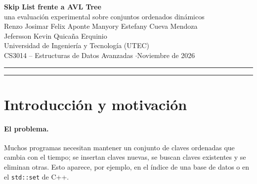 \documentclass[11pt,a4paper]{article}
\begin{document}
\thispagestyle{empty}
\begin{center}
  {\LARGE\bfseries Skip List frente a AVL Tree}\\[5pt]
  {\large una evaluación experimental sobre conjuntos ordenados dinámicos}\\[14pt]
  {\normalsize Renzo Josimar Felix Aponte \qquad Manyory Estefany Cueva Mendoza}\\[2pt]
  {\normalsize Jefersson Kevin Quicaña Erquinio}\\[6pt]
  {\small Universidad de Ingeniería y Tecnología (UTEC)}\\
  {\small CS3014 -- Estructuras de Datos Avanzadas \quad$\cdot$\quad Noviembre de 2026}
\end{center}
\vspace{2pt}
\noindent\rule{\textwidth}{0.4pt}

\begin{abstract}
\noindent
Implementamos desde cero, en C++17 y con una arquitectura hexagonal, una Skip
List y un AVL Tree, y comparamos experimentalmente su tiempo de búsqueda,
inserción y eliminación con tamaños de entrada entre $10^3$ y $10^6$ y datos en
orden aleatorio, ordenado e inverso. Ambas estructuras tienen costo
$O(\log n)$ (esperado en la skip list, de peor caso en el AVL). Con $p = 1/2$,
el AVL fue más rápido en las tres operaciones y en todos los escenarios; con
$n = 10^6$ y datos aleatorios, la búsqueda fue unas $2.6$ veces más rápida y la
inserción y la eliminación unas $2$ veces. El orden de los datos afectó mucho
más que la estructura elegida; insertar claves ordenadas fue hasta $8$ veces
más rápido que insertarlas al azar en ambas estructuras, lo que atribuimos a la
localidad de caché. Al variar $p \in \{0.25, 0.50, 0.80\}$ en la Skip List,
vimos que $p = 0.50$ dio el menor tiempo en consultas aleatorias, $p = 0.25$
redujo niveles y memoria a costa de más fallos de caché ($1.2$--$1.5\times$ más
lenta a $n = 10^6$), y $p = 0.80$ degeneró hasta ser $51\times$ más lenta que el
AVL en $n = 10^5$ al saturar \texttt{MaxLevel}$\,=20$.
\end{abstract}
\noindent\rule{\textwidth}{0.4pt}

\section{Introducción y motivación}

\paragraph{El problema.}
Muchos programas necesitan mantener un conjunto de claves ordenadas que cambia
con el tiempo; se insertan claves nuevas, se buscan claves existentes y se
eliminan otras. Esto aparece, por ejemplo, en el índice de una base de datos o en
el \texttt{std::set} de C++.
\end{document}
